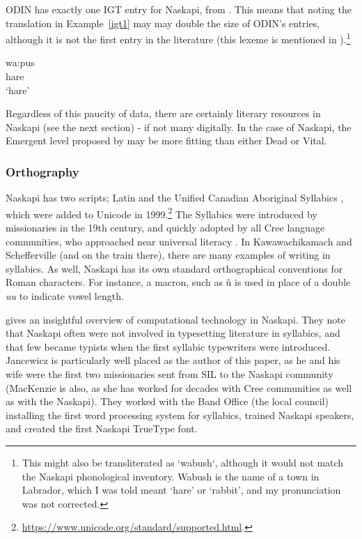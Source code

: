 ODIN has exactly one IGT entry for Naskapi, from \citet{richards2004syntax}. This means that noting the translation in Example~\ref{igt1} may may double the size of ODIN's entries, although it is not the first entry in the literature (this lexeme is mentioned in \citet{macKenzie1980towards}).\footnote{This might also be transliterated as `wabush`, although it would not match the Naskapi phonological inventory. Wabush is the name of a town in Labrador, which I was told meant `hare' or `rabbit', and my pronunciation was not corrected.}

\begin{exe}
\ex
\gll wa:pus\\
hare\\
\trans `hare'
\label{igt1}
\end{exe}

Regardless of this paucity of data, there are certainly literary resources in Naskapi (see the next section) - if not many digitally. In the case of Naskapi, the Emergent level proposed by \citet{gibson2016assessing} may be more fitting than either Dead or Vital.

\subsubsection{Orthography}
Naskapi has two scripts; Latin and the Unified Canadian Aboriginal Syllabics \citep{wals-141}, which were added to Unicode in 1999.\footnote{\href{https://www.unicode.org/standard/supported.html}{https://www.unicode.org/standard/supported.html}. } The Syllabics were introduced by missionaries in the 19th century, and quickly adopted by all Cree language communities, who approached near universal literacy \citep{bennett1991cree}. In Kawawachikamach and Schefferville (and on the train there), there are many examples of writing in syllabics. As well, Naskapi has its own standard orthographical conventions for Roman characters. For instance, a macron, such as \^u is used in place of a double \emph{uu} to indicate vowel length.

\citet{jancewicz2002applied} gives an insightful overview of computational technology in Naskapi. They note that Naskapi often were not involved in typesetting literature in syllabics, and that few became typists when the first syllabic typewriters were introduced. Jancewicz is particularly well placed as the author of this paper, as he and his wife were the first two missionaries sent from SIL to the Naskapi community (MacKenzie is also, as she has worked for decades with Cree communities as well as with the Naskapi). They worked with the Band Office (the local council) installing the first word processing system for syllabics, trained Naskapi speakers, and created the first Naskapi TrueType font.

